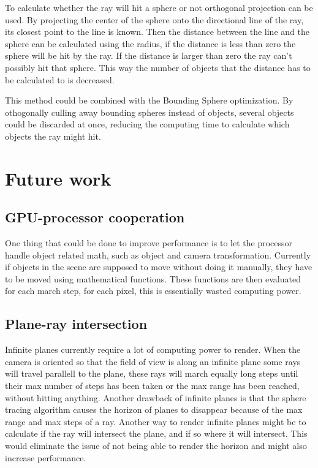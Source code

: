 			To calculate whether the ray will hit a sphere or not orthogonal 
			projection can be used. By projecting the center of the sphere onto
			the directional line of the ray, its closest point to the line is known.
			Then the distance between the line and the sphere can be calculated using
			the radius, if the distance is less than zero the sphere will be hit
			by the ray. If the distance is larger than zero the ray can't possibly hit 
			that sphere. This way the number of objects that the distance has to be 
			calculated to is decreased. 

			This method could be combined with the Bounding Sphere optimization.
			By othogonally culling away bounding spheres instead of objects, 
			several objects could be discarded at once, reducing the computing
			time to calculate which objects the ray might hit.

	\section{Future work}

		\subsection{GPU-processor cooperation}
		
			One thing that could be done to improve performance is to let the
			processor handle object related math, such as object and camera 
			transformation. Currently if objects in the scene are supposed to 
			move without doing it manually, they have to be moved using 
			mathematical functions. These functions are then evaluated for 
			each march step, for each pixel, this is essentially wasted 
			computing power.


		\subsection{Plane-ray intersection}

			Infinite planes currently require a lot of computing power to render. When
			the camera is oriented so that the field of view is along an infinite
			plane some rays will travel parallell to the plane, these rays will march 
			equally long steps until their max number of steps has been taken or
			the max range has been reached, without hitting anything. Another
			drawback of infinite planes is that the sphere tracing algorithm causes
			the horizon of planes to disappear because of the max range and max 
			steps of a ray. Another way to render infinite planes might be to 
			calculate if the ray will intersect the plane, and if so where it 
			will intersect. This would eliminate the issue of not being able 
			to render the horizon and might also increase performance.

